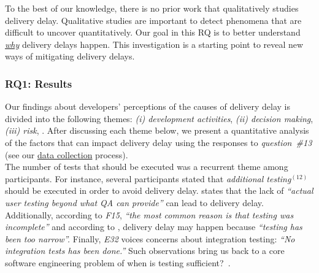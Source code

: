 To the best of our knowledge, there is no prior work that qualitatively studies
delivery delay. Qualitative studies are important to detect phenomena that are
difficult to uncover quantitatively. Our goal in this RQ is to better understand
{\em \underline{why}} delivery delays happen. This investigation is a starting
point to reveal new ways of mitigating delivery delays.\\

\subsubsection*{RQ1: Results}

\begin{sloppypar} Our findings about developers' perceptions of the causes of
	delivery delay is divided into the following themes: {\em (i)
	development activities}, {\em (ii) decision making}, {\em (iii) risk},
	\DIFaddbegin {}\DIFdelbegin {}\DIFdelend \DIFaddbegin {} \DIFaddbegin {}\DIFaddend . After
	discussing each theme below, we present a quantitative analysis of the
	factors that can impact delivery delay using the responses to {\em
	question~\#13} (see our \hyperref[ch5:datacollection2]{data collection}
	process).\\ 

\noindent\DIFdelbegin \textit{\textbf{}%
}%
\DIFdelend \DIFaddbegin {} 
\DIFaddend The number of tests that should be executed was a recurrent theme among
participants. For instance, several participants stated that {\em additional
testing}$^{(12)}$ should be executed in order to avoid delivery delay. {\em
\DIFdelbegin {}\DIFdelend \DIFaddbegin {}\DIFaddend } states that the lack of {\em ``actual user testing beyond what QA can
provide''} can lead to delivery delay. Additionally, according to {\em F15},
{\em ``the most common reason is that testing was incomplete''} and according to {\em
\DIFdelbegin {}\DIFdelend \DIFaddbegin {}\DIFaddend }, delivery delay may happen because {\em ``testing has been too
narrow''.} Finally, {\em E32} voices concerns about integration testing: {\em
``No integration tests has been done.''} Such observations bring us back to a
core software engineering problem of when is testing
sufficient?~\cite{beller2015much,alghamdi2016automated}.


\end{sloppypar}
